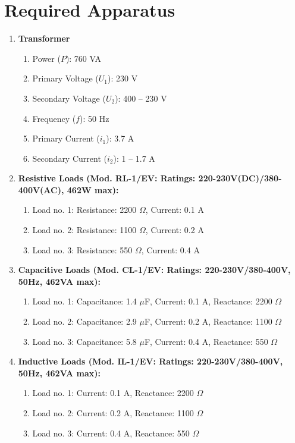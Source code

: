 \documentclass[a4paper,12pt]{article}
\begin{document}
	\section{Required Apparatus}
	\begin{enumerate}
		\item \textbf{Transformer}
		\begin{enumerate}
			\item Power (\(P\)): 760 VA
			\item Primary Voltage (\(U_1\)): 230 V
			\item Secondary Voltage (\(U_2\)): 400 -- 230 V
			\item Frequency (\(f\)): 50 Hz
			\item Primary Current (\(i_1\)): 3.7 A
			\item Secondary Current (\(i_2\)): 1 -- 1.7 A
		\end{enumerate}

		\item \textbf{Resistive Loads (Mod. RL-1/EV: Ratings: 220-230V(DC)/380-400V(AC), 462W max):}
		\begin{enumerate}
			\item Load no. 1: Resistance: 2200 $\Omega$, Current: 0.1 A
			\item Load no. 2: Resistance: 1100 $\Omega$, Current: 0.2 A
			\item Load no. 3: Resistance: 550 $\Omega$, Current: 0.4 A
		\end{enumerate}
		
		\item \textbf{Capacitive Loads (Mod. CL-1/EV: Ratings: 220-230V/380-400V, 50Hz, 462VA max):}
		\begin{enumerate}
			\item Load no. 1: Capacitance: 1.4 $\mu$F, Current: 0.1 A, Reactance: 2200 $\Omega$
			\item Load no. 2: Capacitance: 2.9 $\mu$F, Current: 0.2 A, Reactance: 1100 $\Omega$
			\item Load no. 3: Capacitance: 5.8 $\mu$F, Current: 0.4 A, Reactance: 550 $\Omega$
		\end{enumerate}
		
		\item \textbf{Inductive Loads (Mod. IL-1/EV: Ratings: 220-230V/380-400V, 50Hz, 462VA max):}
		\begin{enumerate}
			\item Load no. 1: Current: 0.1 A, Reactance: 2200 $\Omega$
			\item Load no. 2: Current: 0.2 A, Reactance: 1100 $\Omega$
			\item Load no. 3: Current: 0.4 A, Reactance: 550 $\Omega$
		\end{enumerate}
		

\end{enumerate}
\end{document}
